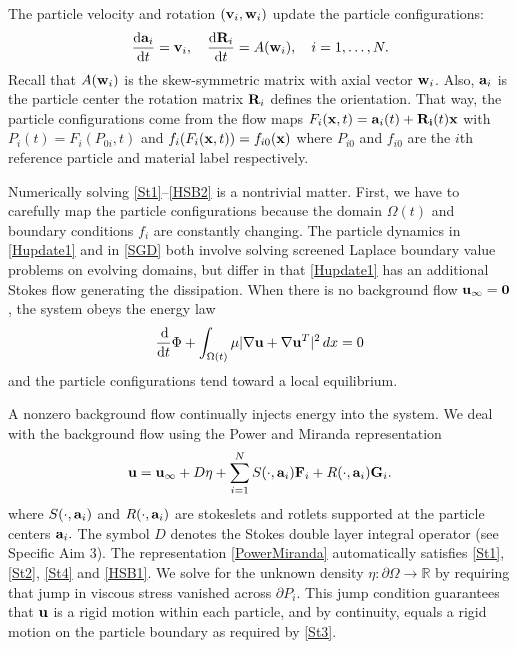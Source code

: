 The particle velocity and rotation $({\bf v}_i, {\bf w}_i)$ update the particle configurations:
\begin{alignat}{3}
\label{Hupdate1}   \frac{\dif {\bf a}_i}{\dif t} = {\bf v}_i,      \quad  \frac{\dif {\bf R}_i}{\dif t}  = A({\bf w}_i),\quad i = 1, \dots, N.
\end{alignat}
Recall that $A({\bf w}_i)$ is the skew-symmetric matrix with axial vector ${\bf w}_i$.
Also, ${\bf a}_i$ is the particle center the rotation matrix ${\bf R}_i$ defines the orientation.
That way, the particle configurations come from the flow maps $F_i({\bf x},t) = {\bf a}_i(t) + {\bf R_i}(t){\bf x}$ with
$P_i(t) = F_i(P_{0i},t)$ and $f_i(F_i({\bf x},t)) = f_{i0}({\bf x})$ where $P_{i0}$ and $f_{i0}$ are the $i$th reference particle
and material label respectively.

Numerically solving \eqref{St1}--\eqref{HSB2} is a nontrivial matter.
First, we have to carefully map the particle configurations because the domain $\Omega(t)$ and boundary conditions $f_i$ are constantly changing.
The particle dynamics in \eqref{Hupdate1} and in \eqref{SGD} both involve solving
screened Laplace boundary value problems on evolving domains, but differ in that \eqref{Hupdate1} has an additional Stokes flow
generating the dissipation. When there is no background flow ${\bf u}_{\infty} = {\bf 0}$, the system obeys the energy law
\begin{equation}
\frac{\dif}{\dif t} \Phi + \int_{\Omega(t)} \mu |\nabla {\bf u} + \nabla {\bf u}^T|^2 \,dx = 0
\end{equation}
and the particle configurations tend toward a local equilibrium.

A nonzero background flow continually injects energy into the system. We deal with the background flow using
the Power and Miranda representation 
\begin{equation}
\label{PowerMiranda}
{\bf u} = {\bf u}_{\infty} + D\eta + \sum_{i=1}^N S(\cdot, {\bf a}_i) {\bf F}_i + R(\cdot, {\bf a}_i) {\bf G}_i.
\end{equation}
where $S(\cdot, {\bf a}_i)$ and $ R(\cdot, {\bf a}_i)$ are stokeslets and rotlets supported at the particle centers ${\bf a}_i.$
The symbol $D$ denotes the Stokes double layer integral operator (see Specific Aim 3).   
The representation \eqref{PowerMiranda} automatically satisfies \eqref{St1}, \eqref{St2}, \eqref{St4} and \eqref{HSB1}.
We solve for the unknown density $\eta : \partial \Omega \to \mathbb{R}$ by requiring that jump in viscous stress
vanished across $\partial P_i$. This jump condition guarantees that ${\bf u}$ is a rigid motion within each particle,
and by continuity, equals a rigid motion on the particle boundary as required by \eqref{St3}.

